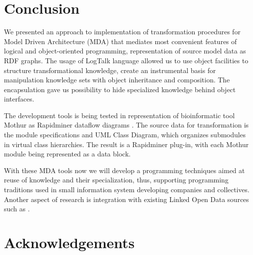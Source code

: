 \documentclass[conference]{IEEEtran} \IEEEoverridecommandlockouts
\begin{document}
\section{Conclusion} 

We presented an approach to implementation of transformation procedures for Model Driven Architecture (MDA) that mediates most convenient features of logical and object-oriented programming, representation of source model data as RDF graphs. The usage of LogTalk language allowed us to use object facilities to structure transformational knowledge, create an instrumental basis for manipulation knowledge sets with object inheritance and composition. The encapsulation gave us possibility to hide specialized knowledge behind object interfaces. 

The development tools is being tested in representation of bioinformatic tool Mothur as Rapidminer dataflow diagrams \cite{bit2019}. The source data for transformation is the module specifications and UML Class Diagram, which organizes submodules in virtual class hierarchies. The result is a Rapidminer plug-in, with each Mothur module being represented as a data block. 

With these MDA tools now we will develop a programming techniques aimed at reuse of knowledge and their specialization, thus, supporting programming traditions used in small information system developing companies and collectives. Another aspect of research is integration with existing Linked Open Data sources such as \cite{digarch}. 

\section{Acknowledgements} \label{sec:ack-descr} 
\end{document}
